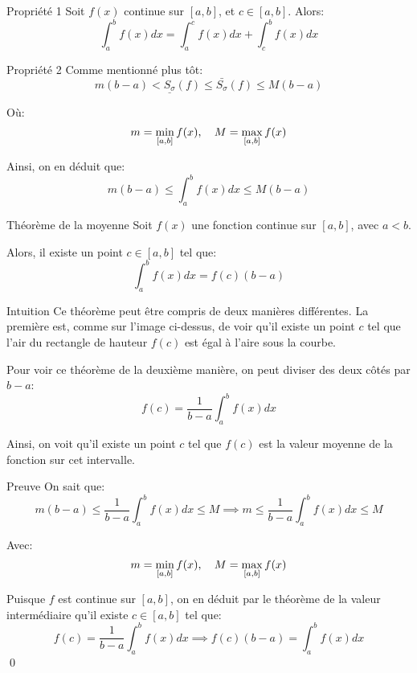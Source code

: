\documentclass[a4paper]{article}
\begin{document}
\begin{parag}{Propriété 1}
    Soit $f\left(x\right)$ continue sur $\left[a,b\right]$, et $c \in \left[a, b\right]$. Alors: 
    \[\int_{a}^{b} f\left(x\right)dx = \int_{a}^{c} f\left(x\right)dx + \int_{c}^{b} f\left(x\right)dx\]
\end{parag}

\begin{parag}{Propriété 2}
    Comme mentionné plus tôt:
    \[m\left(b - a\right) < \underline{S_{\sigma}}\left(f\right) \leq \bar{S_{\sigma}}\left(f\right) \leq M\left(b - a\right)\]

    Où:
    \[m = \min_{\left[a, b\right]} f\left(x\right), \mathspace M = \max_{\left[a, b\right]}f\left(x\right)\]

    Ainsi, on en déduit que: 
    \[m\left(b - a\right) \leq \int_{a}^{b} f\left(x\right) dx \leq M\left(b - a\right)\]
\end{parag}

\begin{parag}{Théorème de la moyenne}
    Soit $f\left(x\right)$ une fonction continue sur $\left[a, b\right]$, avec $a < b$. 

    Alors, il existe un point $c \in \left[a, b\right]$ tel que: 
    \[\int_{a}^{b} f\left(x\right) dx = f\left(c\right)\left(b - a\right)\]
    

    \begin{subparag}{Intuition}
        Ce théorème peut être compris de deux manières différentes. La première est, comme sur l'image ci-dessus, de voir qu'il existe un point $c$ tel que l'air du rectangle de hauteur $f\left(c\right)$ est égal à l'aire sous la courbe.
        
        Pour voir ce théorème de la deuxième manière, on peut diviser des deux côtés par $b - a$: 
        \[f\left(c\right) = \frac{1}{b-a} \int_{a}^{b} f\left(x\right)dx\]
        
        Ainsi, on voit qu'il existe un point $c$ tel que $f\left(c\right)$ est la valeur moyenne de la fonction sur cet intervalle.
    \end{subparag}
    

    \begin{subparag}{Preuve}
        On sait que: 
        \[m\left(b-a\right) \leq \frac{1}{b-a} \int_{a}^{b} f\left(x\right) dx \leq M \implies m \leq \frac{1}{b-a} \int_{a}^{b} f\left(x\right)dx \leq M \]
        
        Avec:
        \[m = \min_{\left[a, b\right]} f\left(x\right), \mathspace M = \max_{\left[a, b\right]}f\left(x\right)\]

        Puisque $f$ est continue sur $\left[a, b\right]$, on en déduit par le théorème de la valeur intermédiaire qu'il existe $c \in \left[a, b\right]$ tel que: 
        \[f\left(c\right) = \frac{1}{b-a}\int_{a}^{b} f\left(x\right)dx \implies f\left(c\right)\left(b - a\right) = \int_{a}^{b} f\left(x\right)dx\]
        \qed
    \end{subparag}
\end{parag}
\end{document}
